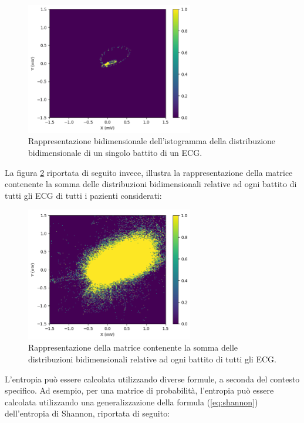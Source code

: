 \documentclass[12pt,italian]{report}
\begin{document}
	\begin{figure}[H]
		\centering
		\includegraphics[width=0.65\textwidth]{immagini/hist.png}
		\captionsetup{justification=centering}
		\caption{Rappresentazione bidimensionale dell'istogramma della distribuzione bidimensionale di un singolo battito di un ECG.}
		\label{fig:hist}
	\end{figure}
	
	La figura \ref{fig:hists} riportata di seguito invece, illustra la rappresentazione della matrice contenente la somma delle distribuzioni bidimensionali relative ad ogni battito di tutti gli ECG di tutti i pazienti considerati:
	
	\begin{figure}[H]
		\centering
		\includegraphics[width=0.65\textwidth]{immagini/hists.png}
		\captionsetup{justification=centering}
		\caption{Rappresentazione della matrice contenente la somma delle distribuzioni bidimensionali relative ad ogni battito di tutti gli ECG.}
		\label{fig:hists}
	\end{figure}
	
	L’entropia può essere calcolata utilizzando diverse formule, a seconda del contesto specifico. Ad esempio, per una matrice di probabilità, l’entropia può essere calcolata utilizzando una generalizzazione della formula (\ref{eq:shannon}) dell’entropia di Shannon, riportata di seguito:
	
\end{document}
